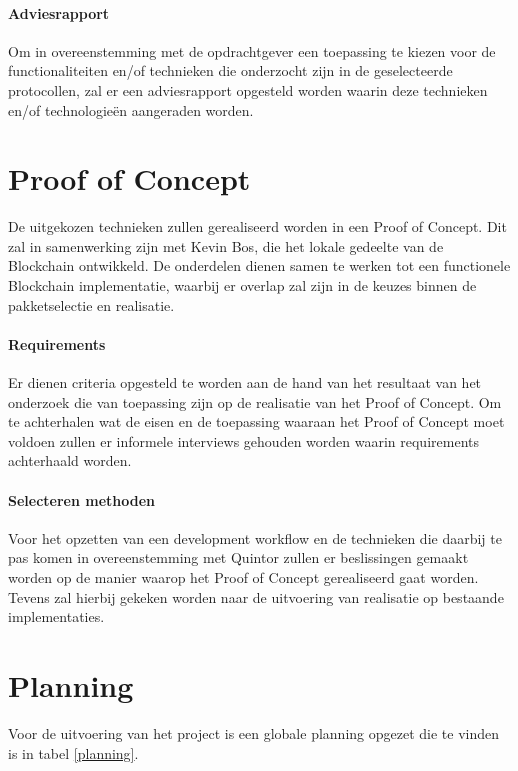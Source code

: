 \paragraph{Adviesrapport} Om in overeenstemming met de opdrachtgever een toepassing te kiezen voor de functionaliteiten en/of technieken die onderzocht zijn in de geselecteerde protocollen, zal er een adviesrapport opgesteld worden waarin deze technieken en/of technologieën aangeraden worden. 

\clearpage
\section{Proof of Concept}
De uitgekozen technieken zullen gerealiseerd worden in een Proof of Concept. Dit zal in samenwerking zijn met Kevin Bos, die het lokale gedeelte van de Blockchain ontwikkeld. De onderdelen dienen samen te werken tot een functionele Blockchain implementatie, waarbij er overlap zal zijn in de keuzes binnen de pakketselectie en realisatie.

\paragraph{Requirements} Er dienen criteria opgesteld te worden aan de hand van het resultaat van het onderzoek die van toepassing zijn op de realisatie van het Proof of Concept. Om te achterhalen wat de eisen en de toepassing waaraan het Proof of Concept moet voldoen zullen er informele interviews gehouden worden waarin requirements achterhaald worden.

\paragraph{Selecteren methoden} Voor het opzetten van een development workflow en de technieken die daarbij te pas komen in overeenstemming met Quintor zullen er beslissingen gemaakt worden op de manier waarop het Proof of Concept gerealiseerd gaat worden. Tevens zal hierbij gekeken worden naar de uitvoering van realisatie op bestaande implementaties.

\clearpage
\section{Planning}
Voor de uitvoering van het project is een globale planning opgezet die te vinden is in tabel \ref{planning}.

